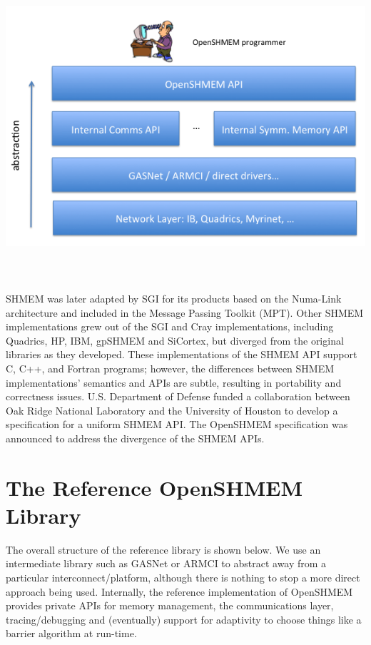 \documentclass[english]{article}
\begin{document}
SHMEM was later adapted by SGI for its products based on the Numa-Link
architecture and included in the Message Passing Toolkit (MPT). Other
SHMEM implementations grew out of the SGI and Cray implementations,
including Quadrics, HP, IBM, gpSHMEM and SiCortex, but diverged from
the original libraries as they developed. These implementations of
the SHMEM API support C, C++, and Fortran programs; however, the differences
between SHMEM implementations' semantics and APIs are subtle, resulting
in portability and correctness issues. U.S. Department of Defense
funded a collaboration between Oak Ridge National Laboratory and the
University of Houston to develop a specification for a uniform SHMEM
API. The OpenSHMEM specification was announced to address the divergence
of the SHMEM APIs. 


\section{The Reference OpenSHMEM Library}

The overall structure of the reference library is shown below. We
use an intermediate library such as GASNet or ARMCI to abstract away
from a particular interconnect/platform, although there is nothing
to stop a more direct approach being used. Internally, the reference
implementation of OpenSHMEM provides private APIs for memory management,
the communications layer, tracing/debugging and (eventually) support
for adaptivity to choose things like a barrier algorithm at run-time.

\medskip{}



\title{\includegraphics[scale=0.5]{implementation}}
\end{document}
